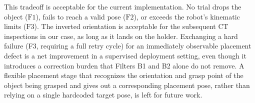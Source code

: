 \documentclass[oneside,studentpaper]{wbk}
\begin{document}
This tradeoff is acceptable for the current implementation. No trial drops the object ($\text{F1}$), fails to reach a valid pose ($\text{F2}$), or exceeds the robot's kinematic limits ($\text{F3}$). The inverted orientation is acceptable for the subsequent CT inspections in our case, as long as it lands on the holder. Exchanging a hard failure (F3, requiring a full retry cycle) for an immediately observable placement defect is a net improvement in a supervised deployment setting, even though it introduces a correction burden that Filters B1 and B2 alone do not remove. A flexible placement stage that recognizes the orientation and grasp point of the object being grasped and gives out a corresponding placement pose, rather than relying on a single hardcoded target pose, is left for future work.
\end{document}
